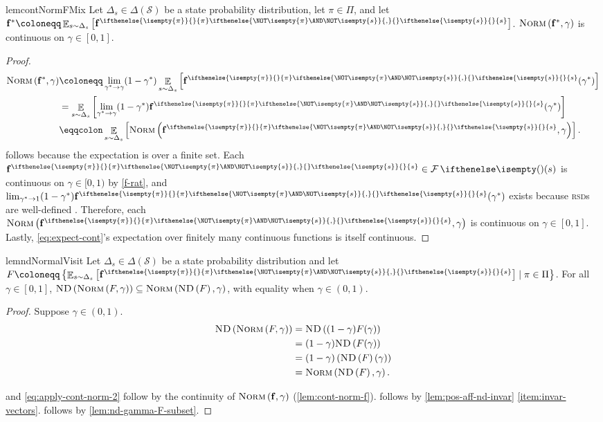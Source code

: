 \documentclass{article}
\newcommand*{\prn}[1]{\left(#1\right)}
\newcommand*{\brx}[1]{\left[#1\right]}
\renewcommand{\set}[1]{\left\{#1\right\}}
\newcommand*{\defeq}{\coloneqq} %
\newcommand*{\eqdef}{\eqqcolon} %
\newcommand*{\upsc}[1]{\text{\upshape\textsc{#1}}}
\newcommand*{\rsd}[1][r]{{\textsc{#1sd}}}
\newcommand*{\St}{\mathcal{S}}
\DeclareMathOperator*{\opE}{\mathbb{E}}
\newcommand*{\E}[2]{\opE_{#1}\brx{#2}} %
\newcommand*{\f}{\mathbf{f}} %
\newcommand*{\fpi}[2][\pi]{\f^{
\ifthenelse{\isempty{#1}}{}{#1} %
\ifthenelse{\NOT\isempty{#1} \AND \NOT\isempty{#2}}{,}{} %
\ifthenelse{\isempty{#2}}{}{#2}}} %
\newcommand*{\ND}[1]{\upsc{ND}\prn{#1}}
\newcommand*{\NormF}[1]{\upsc{Norm}\prn{#1}}
\theoremstyle{definition}
\begin{document}
\begin{appendices}
\begin{restatable}{lem}{contNormFMix}\label{lem:cont-norm-f}
Let $\Delta_s\in \Delta(\St)$ be a state probability distribution, let $\pi\in\Pi$, and let $\f^*\defeq \E{s\sim \Delta_s}{\fpi{s}}$. $\NormF{\f^*, \gamma}$ is continuous on $\gamma\in [0,1]$.
\end{restatable}
\begin{proof}
\begin{align}
    \NormF{\f^*,\gamma}&\defeq \lim_{\gamma^*\to\gamma} (1-\gamma^*)\E{s\sim \Delta_s}{\fpi{s}(\gamma^*)}\\
    &=\E{s\sim \Delta_s}{\lim_{\gamma^*\to\gamma} (1-\gamma^*)\fpi{s}(\gamma^*)}\label{eq:expect-lim-swap}\\
    &\eqdef \E{s\sim \Delta_s}{\NormF{\fpi{s},\gamma}}.\label{eq:expect-cont}
\end{align}
 follows because the expectation is over a finite set. Each $\fpi{s}\in\F(s)$ is continuous on $\gamma\in[0,1)$ by \cref{f-rat}, and $\lim_{\gamma^*\to 1} (1-\gamma^*) \fpi{s}(\gamma^*)$ exists because {\rsd}s are well-defined \citep{puterman_markov_2014}. Therefore, each $\NormF{\fpi{s},\gamma}$ is continuous on $\gamma\in[0,1]$. Lastly, \cref{eq:expect-cont}'s expectation over finitely many continuous functions is itself continuous. 
\end{proof}

\begin{restatable}{lem}{ndNormalVisit}\label{lem:nd-norm-visit}
Let $\Delta_s\in \Delta(\St)$ be a state probability distribution and let $F\defeq \set{\E{s\sim \Delta_s}{\fpi{s}}\mid\pi\in\Pi}$. For all $\gamma\in[0,1]$, $\ND{\NormF{F,\gamma}}\subseteq \NormF{\ND{F},\gamma}$, with equality when $\gamma\in(0,1)$.
\end{restatable}
\begin{proof}
Suppose $\gamma\in (0,1)$.
\begin{align}
    \ND{\NormF{F,\gamma}}&=\ND{(1-\gamma)F(\gamma)}\label{eq:apply-cont-norm-1}\\
    &= (1-\gamma)\ND{F(\gamma)}\label{eq:nd-rescale-invariant}\\
    &= (1-\gamma)\prn{\ND{F}(\gamma)}\label{eq:nd-invariant-01}\\
    &= \NormF{\ND{F},\gamma}.\label{eq:apply-cont-norm-2}
\end{align}

 and \cref{eq:apply-cont-norm-2} follow by the continuity of $\NormF{\f,\gamma}$ (\cref{lem:cont-norm-f}).  follows by \cref{lem:pos-aff-nd-invar} \cref{item:invar-vectors}.  follows by \cref{lem:nd-gamma-F-subset}.


\end{proof}
\end{appendices}
\end{document}
